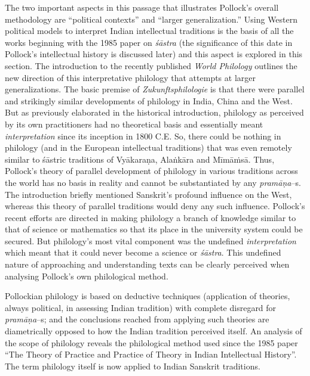 The two important aspects in this passage that illustrates Pollock’s overall methodology are “political contexts” and “larger generalization.” Using Western political models to interpret Indian intellectual traditions is the basis of all the works beginning with the 1985 paper on \textit{śāstra} (the significance of this date in Pollock’s intellectual history is discussed later) and this aspect is explored in this section. The introduction to the recently published \textit{World Philology} outlines the new direction of this interpretative philology that attempts at larger generalizations. The basic premise of \textit{Zukunftsphilologie} is that there were parallel and strikingly similar developments of philology in India, China and the West. But as previously elaborated in the historical introduction, philology as perceived by its own practitioners had no theoretical basis and essentially meant \textit{interpretation} since its inception in 1800 C.E. So, there could be nothing in philology (and in the European intellectual traditions) that was even remotely similar to śāstric traditions of Vyākaraṇa, Alaṅkāra and Mīmāṁsā. Thus, Pollock’s theory of parallel development of philology in various traditions across the world has no basis in reality and cannot be substantiated by any \textit{pramāṇa}–s. The introduction briefly mentioned Sanskrit’s profound influence on the West, whereas this theory of parallel traditions would deny any such influence. Pollock’s recent efforts are directed in making philology a branch of knowledge similar to that of science or mathematics so that its place in the university system could be secured. But philology’s most vital component was the undefined \textit{interpretation} which meant that it could never become a science or \textit{śāstra}. This undefined nature of approaching and understanding texts can be clearly perceived when analysing Pollock’s own philological method.

Pollockian philology is based on deductive techniques (application of theories, always political, in assessing Indian tradition) with complete disregard for \textit{pramāṇa}–s; and the conclusions reached from applying such theories are diametrically opposed to how the Indian tradition perceived itself. An analysis of the scope of philology reveals the philological method used since the 1985 paper “The Theory of Practice and Practice of Theory in Indian Intellectual History”. The term philology itself is now applied to Indian Sanskrit traditions.

